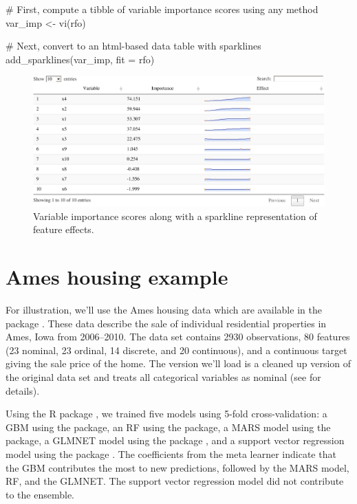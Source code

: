 \begin{Schunk}
\begin{Sinput}
# First, compute a tibble of variable importance scores using any method
var_imp <- vi(rfo)

# Next, convert to an html-based data table with sparklines
add_sparklines(var_imp, fit = rfo)
\end{Sinput}
\begin{figure}[!htb]

{\centering \includegraphics[width=1\linewidth]{greenwell-boehmke_files/figure-latex/sparklines-1} 

}

\caption[Variable importance scores along with a sparkline representation of feature effects]{Variable importance scores along with a sparkline representation of feature effects.}\label{fig:sparklines}
\end{figure}
\end{Schunk}

\section{Ames housing example}

For illustration, we'll use the Ames housing data \citep{ames-cock-2011}
which are available in the  package
\citep{R-AmesHousing}. These data describe the sale of individual
residential properties in Ames, Iowa from 2006--2010. The data set
contains 2930 observations, 80 features (23 nominal, 23 ordinal, 14
discrete, and 20 continuous), and a continuous target giving the sale
price of the home. The version we'll load is a cleaned up version of the
original data set and treats all categorical variables as nominal (see
 for details).

Using the R package  \citep{R-SuperLearner}, we
trained five models using 5-fold cross-validation: a GBM using the
 package, an RF using the  package, a MARS
model using the  package, a GLMNET model using the
 package \citep{R-glmnet}, and a support vector
regression model using the  package \citep{R-kernlab}.
The coefficients from the meta learner indicate that the GBM contributes
the most to new predictions, followed by the MARS model, RF, and the
GLMNET. The support vector regression model did not contribute to the
ensemble.

